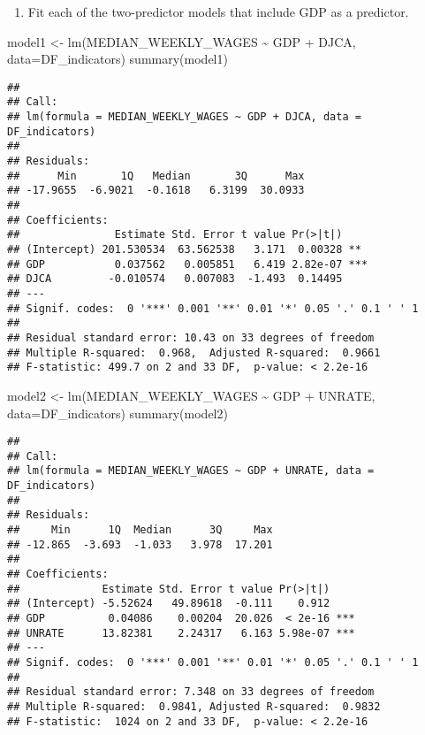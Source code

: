 \documentclass[
]{article}
\newenvironment{Shaded}{\begin{snugshade}}{\end{snugshade}}
\newcommand{\AttributeTok}[1]{\textcolor[rgb]{0.77,0.63,0.00}{#1}}
\newcommand{\FunctionTok}[1]{\textcolor[rgb]{0.00,0.00,0.00}{#1}}
\newcommand{\NormalTok}[1]{#1}
\newcommand{\OtherTok}[1]{\textcolor[rgb]{0.56,0.35,0.01}{#1}}
\newcommand{\SpecialCharTok}[1]{\textcolor[rgb]{0.00,0.00,0.00}{#1}}
\providecommand{\tightlist}{%
  \setlength{\itemsep}{0pt}\setlength{\parskip}{0pt}}
\begin{document}
\begin{enumerate}
\def\labelenumi{\arabic{enumi}.}
\setcounter{enumi}{1}
\tightlist
\item
  Fit each of the two-predictor models that include GDP as a predictor.
\end{enumerate}

\begin{Shaded}
\begin{Highlighting}[]
\NormalTok{model1 }\OtherTok{\textless{}{-}} \FunctionTok{lm}\NormalTok{(MEDIAN\_WEEKLY\_WAGES }\SpecialCharTok{\textasciitilde{}}\NormalTok{ GDP }\SpecialCharTok{+}\NormalTok{ DJCA, }\AttributeTok{data=}\NormalTok{DF\_indicators)}
\FunctionTok{summary}\NormalTok{(model1)}
\end{Highlighting}
\end{Shaded}

\begin{verbatim}
## 
## Call:
## lm(formula = MEDIAN_WEEKLY_WAGES ~ GDP + DJCA, data = DF_indicators)
## 
## Residuals:
##      Min       1Q   Median       3Q      Max 
## -17.9655  -6.9021  -0.1618   6.3199  30.0933 
## 
## Coefficients:
##               Estimate Std. Error t value Pr(>|t|)    
## (Intercept) 201.530534  63.562538   3.171  0.00328 ** 
## GDP           0.037562   0.005851   6.419 2.82e-07 ***
## DJCA         -0.010574   0.007083  -1.493  0.14495    
## ---
## Signif. codes:  0 '***' 0.001 '**' 0.01 '*' 0.05 '.' 0.1 ' ' 1
## 
## Residual standard error: 10.43 on 33 degrees of freedom
## Multiple R-squared:  0.968,  Adjusted R-squared:  0.9661 
## F-statistic: 499.7 on 2 and 33 DF,  p-value: < 2.2e-16
\end{verbatim}

\begin{Shaded}
\begin{Highlighting}[]
\NormalTok{model2 }\OtherTok{\textless{}{-}} \FunctionTok{lm}\NormalTok{(MEDIAN\_WEEKLY\_WAGES }\SpecialCharTok{\textasciitilde{}}\NormalTok{ GDP }\SpecialCharTok{+}\NormalTok{ UNRATE, }\AttributeTok{data=}\NormalTok{DF\_indicators)}
\FunctionTok{summary}\NormalTok{(model2)}
\end{Highlighting}
\end{Shaded}

\begin{verbatim}
## 
## Call:
## lm(formula = MEDIAN_WEEKLY_WAGES ~ GDP + UNRATE, data = DF_indicators)
## 
## Residuals:
##     Min      1Q  Median      3Q     Max 
## -12.865  -3.693  -1.033   3.978  17.201 
## 
## Coefficients:
##             Estimate Std. Error t value Pr(>|t|)    
## (Intercept) -5.52624   49.89618  -0.111    0.912    
## GDP          0.04086    0.00204  20.026  < 2e-16 ***
## UNRATE      13.82381    2.24317   6.163 5.98e-07 ***
## ---
## Signif. codes:  0 '***' 0.001 '**' 0.01 '*' 0.05 '.' 0.1 ' ' 1
## 
## Residual standard error: 7.348 on 33 degrees of freedom
## Multiple R-squared:  0.9841, Adjusted R-squared:  0.9832 
## F-statistic:  1024 on 2 and 33 DF,  p-value: < 2.2e-16
\end{verbatim}
\end{document}
